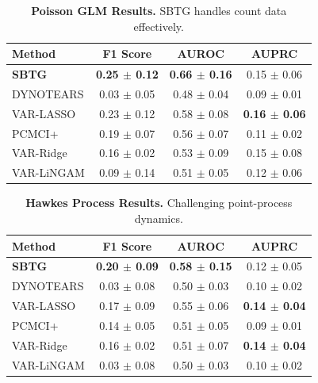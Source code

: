 \documentclass{article}
\theoremstyle{plain}
\theoremstyle{definition}
\theoremstyle{remark}
\newcommand{\1}{\mathbf{1}}
\begin{document}
\begin{table}[h!]
\centering
\caption{\textbf{Poisson GLM Results.} SBTG handles count data effectively.}
\label{tab:res_poisson}
\begin{small}
\begin{tabular}{lccc}
\toprule
Method & F1 Score & AUROC & AUPRC \\
\midrule
\textbf{SBTG} & \textbf{0.25 $\pm$ 0.12} & \textbf{0.66 $\pm$ 0.16} & {0.15 $\pm$ 0.06} \\
DYNOTEARS & 0.03 $\pm$ 0.05 & 0.48 $\pm$ 0.04 & 0.09 $\pm$ 0.01 \\
VAR-LASSO & 0.23 $\pm$ 0.12 & 0.58 $\pm$ 0.08 & \textbf{0.16 $\pm$ 0.06} \\
PCMCI+ & 0.19 $\pm$ 0.07 & 0.56 $\pm$ 0.07 & 0.11 $\pm$ 0.02 \\
VAR-Ridge & 0.16 $\pm$ 0.02 & 0.53 $\pm$ 0.09 & 0.15 $\pm$ 0.08 \\
VAR-LiNGAM & 0.09 $\pm$ 0.14 & 0.51 $\pm$ 0.05 & 0.12 $\pm$ 0.06 \\
\bottomrule
\end{tabular}
\end{small}
\end{table}

\begin{table}[h!]
\centering
\caption{\textbf{Hawkes Process Results.} Challenging point-process dynamics.}
\label{tab:res_hawkes}
\begin{small}
\begin{tabular}{lccc}
\toprule
Method & F1 Score & AUROC & AUPRC \\
\midrule
\textbf{SBTG} & \textbf{0.20 $\pm$ 0.09} & \textbf{0.58 $\pm$ 0.15} & {0.12 $\pm$ 0.05} \\
DYNOTEARS & 0.03 $\pm$ 0.08 & 0.50 $\pm$ 0.03 & 0.10 $\pm$ 0.02 \\
VAR-LASSO & 0.17 $\pm$ 0.09 & 0.55 $\pm$ 0.06 & \textbf{0.14 $\pm$ 0.04} \\
PCMCI+ & 0.14 $\pm$ 0.05 & 0.51 $\pm$ 0.05 & 0.09 $\pm$ 0.01 \\
VAR-Ridge & 0.16 $\pm$ 0.02 & 0.51 $\pm$ 0.07 & \textbf{0.14 $\pm$ 0.04} \\
VAR-LiNGAM & 0.03 $\pm$ 0.08 & 0.50 $\pm$ 0.03 & 0.10 $\pm$ 0.02 \\
\bottomrule
\end{tabular}
\end{small}
\end{table}
\end{document}
